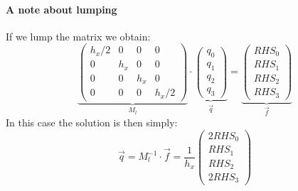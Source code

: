 \paragraph{A note about lumping} If we lump the matrix we obtain:
\begin{equation}
\underbrace{\left(
\begin{array}{cccc}
h_x/2 & 0  &  0 & 0\\
0 & h_x  & 0  & 0\\
0 & 0  & h_x  & 0 \\ 
0 & 0  &  0 & h_x/2
\end{array}
\right)}_{M_l}
\cdot
\underbrace{
\left(
\begin{array}{c}
q_0 \\ q_1 \\ q_2 \\ q_3
\end{array}
\right)
}_{\vec{q}}
=
\underbrace{
\left(
\begin{array}{c}
RHS_0 \\ RHS_1 \\ RHS_2 \\ RHS_3
\end{array}
\right)}_{\vec{f}}
\label{eq:mizu3}
\end{equation}
In this case the solution is then simply:
\[
\vec{q} = M_l^{-1} \cdot \vec{f}
=\frac{1}{h_x}
\left(
\begin{array}{c}
2RHS_0 \\ RHS_1 \\ RHS_2 \\ 2RHS_3
\end{array}
\right)
\]




